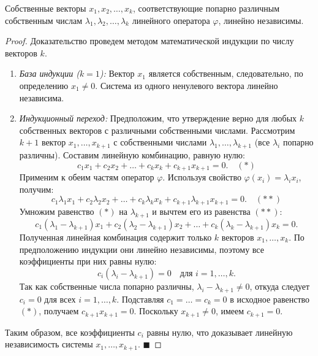 \begin{theorem}
Собственные векторы $x_1, x_2, \dots, x_k$, соответствующие попарно различным собственным числам $\lambda_1, \lambda_2, \dots, \lambda_k$ линейного оператора $\varphi$, линейно независимы.
\end{theorem}

\begin{proof}
Доказательство проведем методом математической индукции по числу векторов $k$.
\begin{enumerate}
    \item \textit{База индукции ($k=1$):} Вектор $x_1$ является собственным, следовательно, по определению $x_1 \neq 0$. Система из одного ненулевого вектора линейно независима.
    \item \textit{Индукционный переход:} Предположим, что утверждение верно для любых $k$ собственных векторов с различными собственными числами. Рассмотрим $k+1$ вектор $x_1, \dots, x_{k+1}$ с собственными числами $\lambda_1, \dots, \lambda_{k+1}$ (все $\lambda_i$ попарно различны).
    Составим линейную комбинацию, равную нулю:
    \[
    c_1 x_1 + c_2 x_2 + \dots + c_k x_k + c_{k+1} x_{k+1} = 0. \quad (*)
    \]
    Применим к обеим частям оператор $\varphi$. Используя свойство $\varphi(x_i) = \lambda_i x_i$, получим:
    \[
    c_1 \lambda_1 x_1 + c_2 \lambda_2 x_2 + \dots + c_k \lambda_k x_k + c_{k+1} \lambda_{k+1} x_{k+1} = 0. \quad (**)
    \]
    Умножим равенство $(*)$ на $\lambda_{k+1}$ и вычтем его из равенства $(**)$:
    \[
    c_1 (\lambda_1 - \lambda_{k+1}) x_1 + c_2 (\lambda_2 - \lambda_{k+1}) x_2 + \dots + c_k (\lambda_k - \lambda_{k+1}) x_k = 0.
    \]
    Полученная линейная комбинация содержит только $k$ векторов $x_1, \dots, x_k$. По предположению индукции они линейно независимы, поэтому все коэффициенты при них равны нулю:
    \[
    c_i (\lambda_i - \lambda_{k+1}) = 0 \quad \text{для } i = 1, \dots, k.
    \]
    Так как собственные числа попарно различны, $\lambda_i - \lambda_{k+1} \neq 0$, откуда следует $c_i = 0$ для всех $i = 1, \dots, k$.
    Подставляя $c_1 = \dots = c_k = 0$ в исходное равенство $(*)$, получаем $c_{k+1} x_{k+1} = 0$. Поскольку $x_{k+1} \neq 0$, имеем $c_{k+1} = 0$.
\end{enumerate}
Таким образом, все коэффициенты $c_i$ равны нулю, что доказывает линейную независимость системы $x_1, \dots, x_{k+1}$.
\hfill$\blacksquare$
\end{proof}
